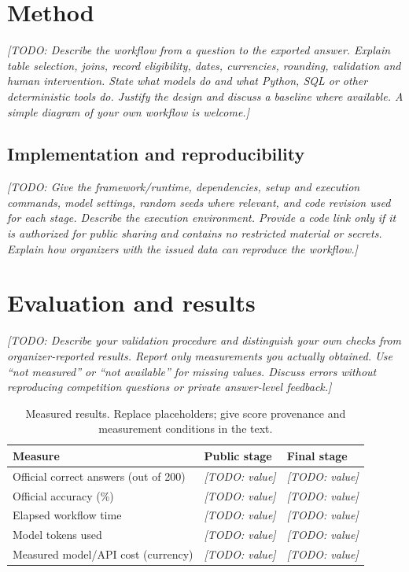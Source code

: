 \documentclass[11pt,a4paper]{article}
\newcommand{\todo}[1]{\textit{[TODO: #1]}}
\begin{document}
\section{Method}
\todo{Describe the workflow from a question to the exported answer. Explain
table selection, joins, record eligibility, dates, currencies, rounding,
validation and human intervention. State what models do and what Python,
SQL or other deterministic tools do. Justify the design and discuss a baseline
where available. A simple diagram of your own workflow is welcome.}

\subsection{Implementation and reproducibility}
\todo{Give the framework/runtime, dependencies, setup and execution commands,
model settings, random seeds where relevant, and code revision used for each
stage. Describe the execution environment. Provide a code link only if it is
authorized for public sharing and contains no restricted material or secrets.
Explain how organizers with the issued data can reproduce the workflow.}

\section{Evaluation and results}
\todo{Describe your validation procedure and distinguish your own checks from
organizer-reported results. Report only measurements you actually obtained.
Use ``not measured'' or ``not available'' for missing values. Discuss errors
without reproducing competition questions or private answer-level feedback.}

\begin{table}[htbp]
\centering
\caption{Measured results. Replace placeholders; give score provenance and
measurement conditions in the text.}
\begin{tabularx}{\linewidth}{@{}Xll@{}}
\toprule
Measure & Public stage & Final stage \\
\midrule
Official correct answers (out of 200) & \todo{value} & \todo{value} \\
Official accuracy (\%) & \todo{value} & \todo{value} \\
Elapsed workflow time & \todo{value} & \todo{value} \\
Model tokens used & \todo{value} & \todo{value} \\
Measured model/API cost (currency) & \todo{value} & \todo{value} \\
\bottomrule
\end{tabularx}
\end{table}
\end{document}
